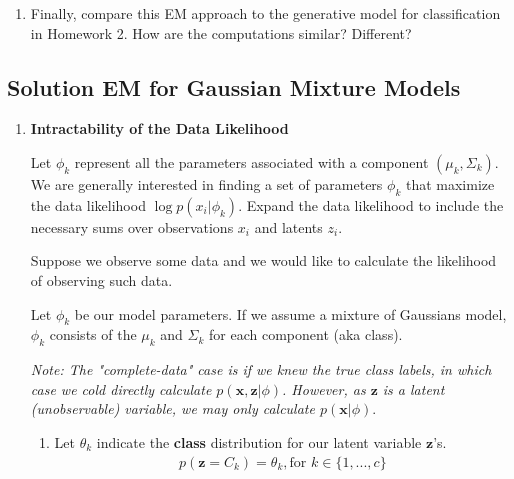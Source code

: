 \documentclass[submit]{harvardml}
\newenvironment{answer}{%
\color{answergreen}\sffamily\large}{}
\newcommand{\bx}{\mathbf{x}} %
\newcommand{\bz}{\mathbf{z}} %
\begin{document}
\begin{problem}
\begin{enumerate}
\item Finally, compare this EM approach to the generative model for
	classification in Homework 2.  How are the computations similar?
	Different? 

\end{enumerate}


  
\end{problem}

\subsection*{Solution EM for Gaussian Mixture Models}


\begin{enumerate}

    \item \textbf{Intractability of the Data Likelihood} 
        
        Let $\phi_k$ represent all the parameters associated with a component $(\mu_k,\Sigma_k)$.
        We are generally interested in finding a set of parameters $\phi_k$ that maximize the data
        likelihood $\log p(x_i|\phi_k)$. Expand the data likelihood to include the necessary
		sums over observations $x_i$ and latents $z_i$. 

		\begin{answer}

            Suppose we observe some data and we would like to calculate the likelihood of observing
            such data. 

            Let $\phi_k$ be our model parameters.
            If we assume a mixture of Gaussians model, $\phi_k$ consists of the $\mu_k$ and $\Sigma_k$ for
            each component (aka class).  

            \textit{Note: The "complete-data" case is if we knew the true class labels, in which
            case we cold directly calculate $p(\bx,\bz |\phi)$. However, as $\bz$ is a latent
            (unobservable) variable, we may only calculate $p(\bx|\phi).$}

            \begin{enumerate}

                \item Let $\theta_k$ indicate the \textbf{class} distribution for our latent variable
                    $\bz$'s.
                    \begin{align}
                        p(\bz = C_k) = \theta_k, \text{for } k \in \{1,...,c\}
                    \end{align}


\end{enumerate}
\end{answer}
\end{enumerate}
\end{document}
